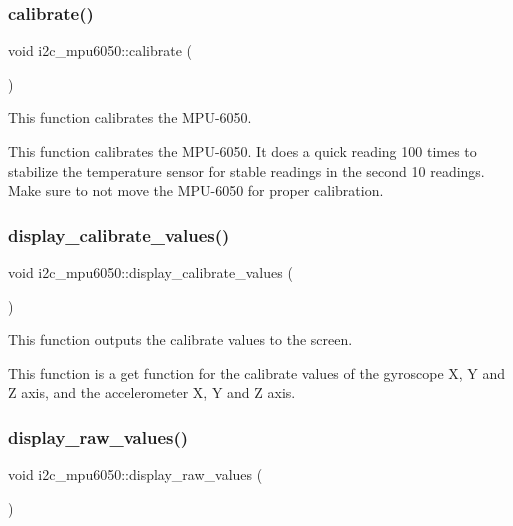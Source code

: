 \subsubsection{\texorpdfstring{calibrate()}{calibrate()}}
{\footnotesize\ttfamily void i2c\+\_\+mpu6050\+::calibrate (\begin{DoxyParamCaption}{ }\end{DoxyParamCaption})}



This function calibrates the M\+P\+U-\/6050. 

This function calibrates the M\+P\+U-\/6050. It does a quick reading 100 times to stabilize the temperature sensor for stable readings in the second 10 readings. Make sure to not move the M\+P\+U-\/6050 for proper calibration. \mbox{\label{classi2c__mpu6050_a6da4020009994ec37d4388ede0284074}} 
\subsubsection{\texorpdfstring{display\+\_\+calibrate\+\_\+values()}{display\_calibrate\_values()}}
{\footnotesize\ttfamily void i2c\+\_\+mpu6050\+::display\+\_\+calibrate\+\_\+values (\begin{DoxyParamCaption}{ }\end{DoxyParamCaption})}



This function outputs the calibrate values to the screen. 

This function is a get function for the calibrate values of the gyroscope X, Y and Z axis, and the accelerometer X, Y and Z axis.  \mbox{\label{classi2c__mpu6050_a24a1e7c044411670d724d1c3e411eea5}} 
\subsubsection{\texorpdfstring{display\+\_\+raw\+\_\+values()}{display\_raw\_values()}}
{\footnotesize\ttfamily void i2c\+\_\+mpu6050\+::display\+\_\+raw\+\_\+values (\begin{DoxyParamCaption}{ }\end{DoxyParamCaption})}



